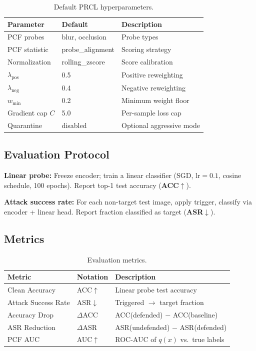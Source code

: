 \documentclass[11pt,a4paper]{article}
\begin{document}
\begin{table}[h]
\centering
\caption{Default PRCL hyperparameters.}
\begin{tabular}{@{}lll@{}}
\toprule
\textbf{Parameter} & \textbf{Default} & \textbf{Description} \\
\midrule
PCF probes & blur, occlusion & Probe types \\
PCF statistic & probe\_alignment & Scoring strategy \\
Normalization & rolling\_zscore & Score calibration \\
$\lambda_{\text{pos}}$ & 0.5 & Positive reweighting \\
$\lambda_{\text{neg}}$ & 0.4 & Negative reweighting \\
$w_{\min}$ & 0.2 & Minimum weight floor \\
Gradient cap $C$ & 5.0 & Per-sample loss cap \\
Quarantine & disabled & Optional aggressive mode \\
\bottomrule
\end{tabular}
\end{table}

\subsection{Evaluation Protocol}

\textbf{Linear probe:} Freeze encoder; train a linear classifier (SGD,
$\text{lr}=0.1$, cosine schedule, 100 epochs).  Report top-1 test accuracy
(\textbf{ACC$\uparrow$}).

\textbf{Attack success rate:} For each non-target test image, apply trigger,
classify via encoder + linear head.  Report fraction classified as target
(\textbf{ASR$\downarrow$}).

\subsection{Metrics}

\begin{table}[h]
\centering
\caption{Evaluation metrics.}
\begin{tabular}{@{}lll@{}}
\toprule
\textbf{Metric} & \textbf{Notation} & \textbf{Description} \\
\midrule
Clean Accuracy & ACC$\uparrow$ & Linear probe test accuracy \\
Attack Success Rate & ASR$\downarrow$ & Triggered $\to$ target fraction \\
Accuracy Drop & $\Delta$ACC & ACC(defended) $-$ ACC(baseline) \\
ASR Reduction & $\Delta$ASR & ASR(undefended) $-$ ASR(defended) \\
PCF AUC & AUC$\uparrow$ & ROC-AUC of $q(x)$ vs.\ true labels \\
\bottomrule
\end{tabular}
\end{table}
\end{document}
